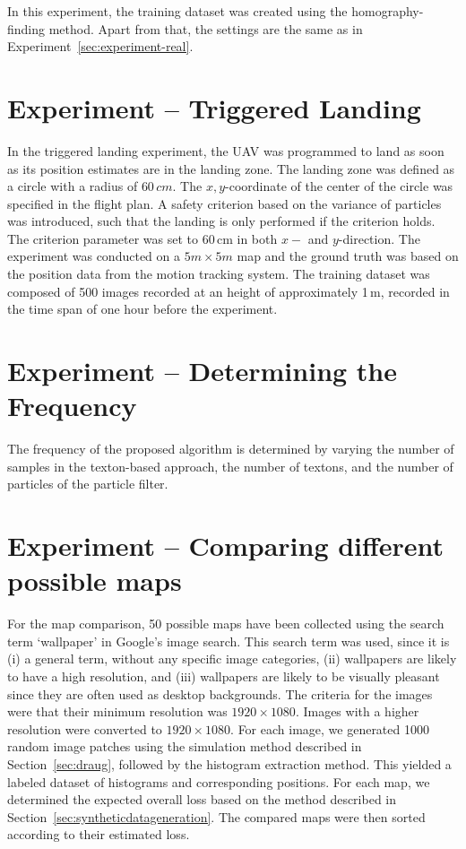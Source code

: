 \documentclass{report}
\begin{document}
In this experiment, the training dataset was created using the
homography-finding method. Apart from that, the settings are the same
as in Experiment~\ref{sec:experiment-real}.

\section{Experiment -- Triggered Landing}

In the triggered landing experiment, the UAV was programmed to land as
soon as its position estimates are in the landing zone. The landing
zone was defined as a circle with a radius of $60\,cm$. The
$x,y$-coordinate of the center of the circle was specified in the
flight plan. A safety criterion based on the variance of particles was
introduced, such that the landing is only performed if the criterion
holds. The criterion parameter was set to 60\,cm in both $x-$ and
$y$-direction. The experiment was conducted on a $5m \times 5m$ map
and the ground truth was based on the position data from the motion
tracking system. The training dataset was composed of 500 images
recorded at an height of approximately 1\,m, recorded in the time span
of one hour before the experiment.


\section{Experiment -- Determining the Frequency}

The frequency of the proposed algorithm is determined by varying the
number of samples in the texton-based approach, the number of textons,
and the number of particles of the particle filter.

\section{Experiment -- Comparing different possible maps}

For the map comparison, 50 possible maps have been collected using the
search term `wallpaper' in Google's image search. This search term was
used, since it is (i) a general term, without any specific image
categories, (ii) wallpapers are likely to have a high resolution, and
(iii) wallpapers are likely to be visually pleasant since they are
often used as desktop backgrounds. The criteria for the images were
that their minimum resolution was $1920 \times 1080$. Images with a
higher resolution were converted to $1920 \times 1080$.  For each
image, we generated 1000 random image patches using the simulation
method described in Section~\ref{sec:draug}, followed by the histogram
extraction method. This yielded a labeled dataset of histograms and
corresponding positions. For each map, we determined the expected
overall loss based on the method described in
Section~\ref{sec:syntheticdatageneration}. The compared maps were then
sorted according to their estimated loss.
\end{document}
